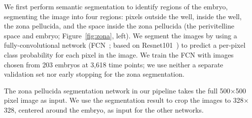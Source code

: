 
 We first perform semantic segmentation to identify regions of the embryo, segmenting the image into four regions: pixels outside the well, inside the well, the zona pellucida, and the space inside the zona pellucida (the perivitelline space and embryo; Figure~\ref{fig:zona}, left). We segment the images by using a fully-convolutional network (FCN~\cite{long2015fully}; based on Resnet101~\cite{he2016deep}) to predict a per-pixel class probability for each pixel in the image. We train the FCN with images chosen from 203 embryos at 3,618 time points; we use neither a separate validation set nor early stopping for the zona segmentation.

The zona pellucida segmentation network in our pipeline takes the full 500$\times$500 pixel image as input. We use the segmentation result to crop the images to 328$\times$328, centered around the embryo, as input for the other networks.
